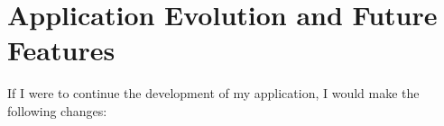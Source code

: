 
\newpage

\clearpage

\chapter{Application Evolution and Future Features}
If I were to continue the development of my application, I would make the following changes:
